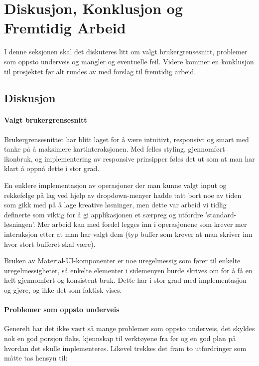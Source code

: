 \chapter{Diskusjon, Konklusjon og Fremtidig Arbeid}

I denne seksjonen skal det diskuteres litt om valgt brukergrensesnitt, problemer som oppsto underveis og mangler og eventuelle feil. Videre kommer en konklusjon til prosjektet før alt rundes av med forslag til fremtidig arbeid. 

\section{Diskusjon}

\subsubsection{Valgt brukergrensesnitt}

Brukergrensesnittet har blitt laget for å være intuitivt, responsivt og smart med tanke på å maksimere kartinteraksjonen. Med felles styling, gjennomført ikonbruk, og implementering av responsive prinsipper føles det ut som at man har klart å oppnå dette i stor grad.

En enklere implementasjon av operasjoner der man kunne valgt input og rekkefølge på lag ved hjelp av dropdown-menyer hadde tatt bort noe av tiden som gikk med på å lage kreative løsninger, men dette var arbeid vi tidlig definerte som viktig for å gi applikasjonen et særpreg og utfordre 'standard-løsningen'. Mer arbeid kan med fordel legges inn i operasjonene som krever mer interaksjon etter at man har valgt dem (typ buffer som krever at man skriver inn hvor stort bufferet skal være). 

Bruken av Material-UI-komponenter er noe uregelmessig som fører til enkelte uregelmessigheter, så enkelte elementer i sidemenyen burde skrives om for å få en helt gjennomført og konsistent bruk. Dette har i stor grad med implementasjon og gjøre, og ikke det som faktisk vises. 

\subsubsection{Problemer som oppsto underveis}

Generelt har det ikke vært så mange problemer som oppsto underveis, det skyldes nok en god porsjon flaks, kjennskap til verktøyene fra før og en god plan på hvordan det skulle implementeres. Likevel trekkes det fram to utfordringer som måtte tas hensyn til: 

